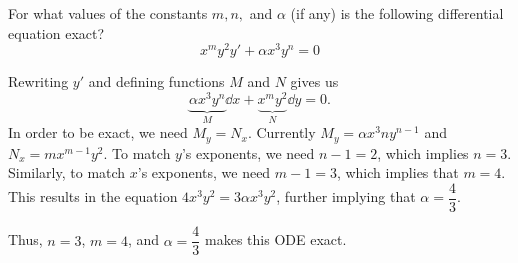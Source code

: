 For what values of the constants $m,n,$ and $\alpha$ (if any) is the following differential equation exact? $$x^m y^2 y' + \alpha x^3 y^n = 0$$

\nnl Rewriting $y'$ and defining functions $M$ and $N$ gives us 
$$\underbrace{\alpha x^3 y^n}_{M} \dd x + \underbrace{x^m y^2}_{N} \dd y = 0.$$
In order to be exact, we need $M_y = N_x$. Currently $M_y = \alpha x^3 n y^{n-1}$ and $N_x = mx^{m-1}y^2$. To match $y$'s exponents, we need $n-1=2$, which implies $n = 3$. Similarly, to match $x$'s exponents, we need $m-1 = 3$, which implies that $m = 4$. This results in the equation $4x^3y^2 = 3 \alpha x^3 y^2$, further implying that $\alpha = \dfrac43$.

\nl Thus, $n = 3$, $m = 4$, and $\alpha = \dfrac43$ makes this ODE exact.

